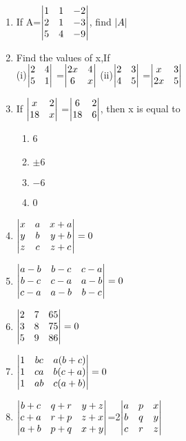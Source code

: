 \documentclass[journal,12pt,twocolumn]{IEEEtran}
\renewcommand\thesection{\arabic{section}}
\begin{document}
\begin{enumerate}[label=\thesection.\arabic*.,ref=\thesection.\theenumi]
\item If A=$\begin{vmatrix}1&1&-2\\2&1&-3\\5&4&-9\end{vmatrix}$, 
find $\left\vert A\right\vert$
\\
\solution 
%
\item Find the values of x,If\\
(i)$\begin{vmatrix}
2&4\\5&1
\end{vmatrix}$ =$\begin{vmatrix}
2x&4 \\ 6&x
\end{vmatrix}$
(ii)$\begin{vmatrix}
2&3 \\ 4&5
\end{vmatrix}$ =$\begin{vmatrix}
x&3 \\ 2x&5
\end{vmatrix}$
\\
\solution 
%
\item If  $\begin{vmatrix}
x&2 \\ 18&x
\end{vmatrix}$ =$\begin{vmatrix}
6&2 \\ 18&6
\end{vmatrix}$, then x is equal to 
\begin{enumerate}
\item 6
\item $\pm 6$
\item $-6$
\item 0
\end{enumerate}
\item $\begin{vmatrix}
x&a&x+a\\y&b&y+b\\z&c&z+c\end{vmatrix}=0$
\\
\solution 
%
\item $\begin{vmatrix}
a-b&b-c&c-a\\b-c&c-a&a-b\\c-a&a-b&b-c\end{vmatrix}=0$
\\
\solution 
%
\item $\begin{vmatrix}2&7&65\\3&8&75\\5&9&86\end{vmatrix}=0$
\\
\solution 
%
\item $\begin{vmatrix}1&bc&a(b+c)\\1&ca&b(c+a)\\1&ab&c(a+b)\end{vmatrix}=0$
\\
\solution 
%
\item $\begin{vmatrix}b+c& q+r& y+z\\c+a& r+p& z+x\\a+b& p+q& x+y\end{vmatrix}$=2$\begin{vmatrix} a&p&x\\b&q&y\\c&r&z\end{vmatrix}$ 

\end{enumerate}
\end{document}
